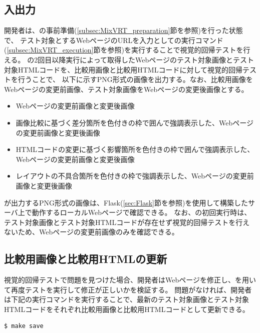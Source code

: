\subsection{入出力}\label{subsec:MixVRT_IO}
開発者は、\toolName の事前準備(\ref{subsec:MixVRT_preparation}節を参照)を行った状態で、
テスト対象とするWebページのURLを入力として\toolName の実行コマンド(\ref{subsec:MixVRT_execution}節を参照)を実行することで視覚的回帰テストを行える。
\toolName の2回目以降実行によって取得したWebページのテスト対象画像とテスト対象HTMLコードを、比較用画像と比較用HTMLコードに対して視覚的回帰テストを行うことで、
以下に示すPNG形式の画像を出力する。なお、比較用画像をWebページの変更前画像、テスト対象画像をWebページの変更後画像とする。
\begin{itemize}
    \item Webページの変更前画像と変更後画像
    \item 画像比較に基づく差分箇所を色付きの枠で囲んで強調表示した、Webページの変更前画像と変更後画像
    \item HTMLコードの変更に基づく影響箇所を色付きの枠で囲んで強調表示した、Webページの変更前画像と変更後画像
    \item レイアウトの不具合箇所を色付きの枠で強調表示した、Webページの変更前画像と変更後画像
\end{itemize}
\toolName が出力するPNG形式の画像は、Flask(\ref{sec:Flask}節を参照)を使用して構築したサーバ上で動作するローカルWebページで確認できる。
なお、\toolName の初回実行時は、テスト対象画像とテスト対象HTMLコードが存在せず視覚的回帰テストを行えないため、Webページの変更前画像のみを確認できる。

\subsection{比較用画像と比較用HTMLの更新}\label{subsec:MixVRT_evaluate}
視覚的回帰テストで問題を見つけた場合、開発者はWebページを修正し、\toolName を用いて再度テストを実行して修正が正しいかを検証する。
問題がなければ、開発者は下記の実行コマンドを実行することで、最新のテスト対象画像とテスト対象HTMLコードをそれぞれ比較用画像と比較用HTMLコードとして更新できる。
\begin{lstlisting}[label=list:command2,frame=none,numbers=none,basicstyle={\normalsize \ttfamily \color[gray]{.15}}]
    $ make save
\end{lstlisting}

